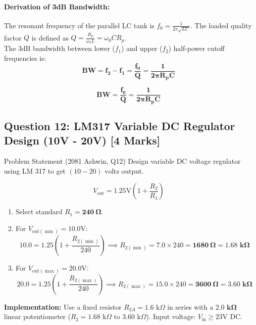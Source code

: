 \documentclass[11pt,a4paper,oneside]{book}
\begin{document}
\paragraph{Derivation of 3dB Bandwidth:}
The resonant frequency of the parallel LC tank is $f_0 = \frac{1}{2\pi\sqrt{LC}}$. The loaded quality factor $Q$ is defined as $Q = \frac{R_p}{\omega_0 L} = \omega_0 C R_p$.\\
The $3\text{dB}$ bandwidth between lower ($f_1$) and upper ($f_2$) half-power cutoff frequencies is:
\[
\mathbf{BW = f_2 - f_1 = \frac{f_0}{Q} = \frac{1}{2\pi R_p C}}
\]

\begin{answerbox}
$$\mathbf{BW = \frac{f_0}{Q} = \frac{1}{2\pi R_p C}}$$
\end{answerbox}

\vspace{0.6cm}

\subsection{Question 12: LM317 Variable DC Regulator Design (10V - 20V) [4 Marks]}
\begin{questionbox}{Problem Statement (2081 Ashwin, Q12)}
Design variable DC voltage regulator using LM 317 to get $(10-20)\text{ volts}$ output.
\end{questionbox}

\[
V_{\text{out}} = 1.25\text{V} \left(1 + \frac{R_2}{R_1}\right)
\]
\begin{enumerate}[leftmargin=1.5em]
  \item Select standard $R_1 = \mathbf{240\ \Omega}$.
  \item For $V_{\text{out}(\min)} = 10.0\text{V}$:
  \[
  10.0 = 1.25 \left(1 + \frac{R_{2(\min)}}{240}\right) \implies R_{2(\min)} = 7.0 \times 240 = \mathbf{1680\ \Omega} = \mathbf{1.68\text{ k}\Omega}
  \]
  \item For $V_{\text{out}(\max)} = 20.0\text{V}$:
  \[
  20.0 = 1.25 \left(1 + \frac{R_{2(\max)}}{240}\right) \implies R_{2(\max)} = 15.0 \times 240 = \mathbf{3600\ \Omega} = \mathbf{3.60\text{ k}\Omega}
  \]
\end{enumerate}
\textbf{Implementation:} Use a fixed resistor $R_{2A} = 1.6\text{ k}\Omega$ in series with a $\mathbf{2.0\text{ k}\Omega}$ linear potentiometer ($R_2 = 1.68\text{ k}\Omega \text{ to } 3.60\text{ k}\Omega$). Input voltage: $V_{\text{in}} \ge 23\text{V DC}$.
\end{document}
